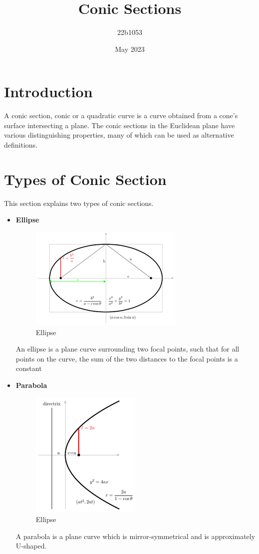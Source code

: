 \documentclass{article}
\title{Conic Sections}
\author{22b1053}
\date{May 2023}
\begin{document}
\maketitle

\tableofcontents
\clearpage

\section{Introduction}
A conic section, conic or a quadratic curve is a curve obtained from a cone's surface intersecting a plane. The conic sections in the Euclidean plane have various distinguishing properties, many of which can be used as alternative
definitions.

\section{Types of Conic Section}
This section explains two types of conic sections.
\begin{itemize}
    \item \textbf{Ellipse}
    \begin{figure}[htbp]
        \centering
        \includegraphics[scale=0.5]{ellipse.png}
        \caption{Ellipse}
        \label{ellipse}
    \end{figure}
    An ellipse is a plane curve surrounding two focal points, such that for all points on the curve, the sum of the two distances to the focal points is a constant
    \item \textbf{Parabola}
    \begin{figure}[htbp]
        \centering
        \includegraphics[scale=0.5]{parabola.png}
        \caption{Ellipse}
        \label{parabola}
    \end{figure}
    A parabola is a plane curve which is mirror-symmetrical and is approximately U-shaped.
\end{itemize}
\end{document}

